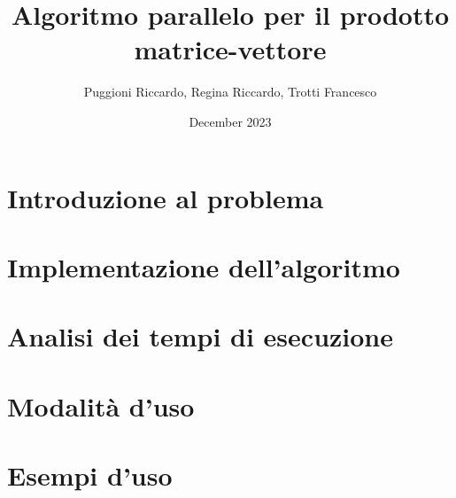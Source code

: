 \documentclass{article}
\title{Algoritmo parallelo per il prodotto matrice-vettore}
\author{Puggioni Riccardo, Regina Riccardo, Trotti Francesco }
\date{December 2023}
\begin{document}
\maketitle

\newpage
\tableofcontents

\newpage
\section{Introduzione al problema}
    

\section{Implementazione dell'algoritmo}
    

\section{Analisi dei tempi di esecuzione}
    

\section{Modalità d'uso}


\section{Esempi d'uso}

\end{document}
